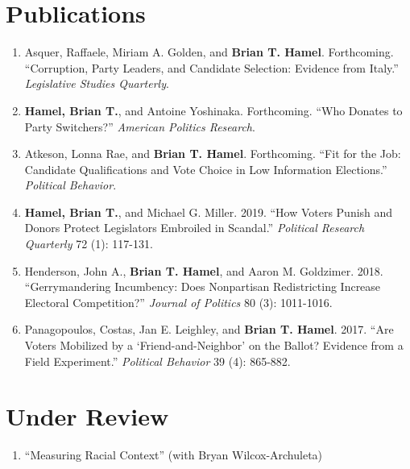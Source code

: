 \documentclass[11pt]{article}
\begin{document}
\section*{Publications}

\begin{enumerate}[topsep = 0pt, itemsep = 1ex, partopsep  = 1ex, parsep = 1ex]

	\item[] Asquer, Raffaele, Miriam A. Golden, and \textbf{Brian T. Hamel}. Forthcoming. ``Corruption, Party Leaders, and Candidate Selection: Evidence from Italy.'' \textit{Legislative Studies Quarterly}.

	\item[] \textbf{Hamel, Brian T.}, and Antoine Yoshinaka. Forthcoming. ``Who Donates to Party Switchers?'' \textit{American Politics Research}.
	
	\item[] Atkeson, Lonna Rae, and \textbf{Brian T. Hamel}. Forthcoming. ``Fit for the Job: Candidate Qualifications and Vote Choice in Low Information Elections.'' \textit{Political Behavior}.

	\item[] \textbf{Hamel, Brian T.}, and Michael G. Miller. 2019. ``How Voters Punish and Donors Protect Legislators Embroiled in Scandal.'' \textit{Political Research Quarterly} 72 (1): 117-131.

	\item[] Henderson, John A., \textbf{Brian T. Hamel}, and Aaron M. Goldzimer. 2018. ``Gerrymandering Incumbency: Does Nonpartisan Redistricting Increase Electoral Competition?'' \textit{Journal of Politics} 80 (3): 1011-1016.

	\item[] Panagopoulos, Costas, Jan E. Leighley, and \textbf{Brian T. Hamel}. 2017. ``Are Voters Mobilized by a `Friend-and-Neighbor' on the Ballot? Evidence from a Field Experiment.'' \textit{Political Behavior} 39 (4): 865-882.

\end{enumerate}

\section*{Under Review}

\begin{enumerate}[topsep = 0pt, itemsep = 1ex, partopsep  = 1ex, parsep = 1ex]

	\item[] ``Measuring Racial Context'' (with Bryan Wilcox-Archuleta)

\end{enumerate}
	
\end{document}
